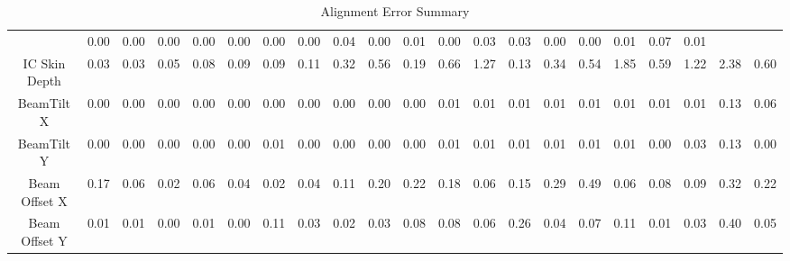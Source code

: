 \begin{table}[ht]
\begin{tabular}{|c | c c c c c c c c c c c c c c c c c c c c | }
 & 0.00
 & 0.00
 & 0.00
 & 0.00
 & 0.00
 & 0.00
 & 0.00
 & 0.04
 & 0.00
 & 0.01
 & 0.00
 & 0.03
 & 0.03
 & 0.00
 & 0.00
 & 0.01
 & 0.07
 & 0.01
\\
IC Skin Depth & 0.03
 & 0.03
 & 0.05
 & 0.08
 & 0.09
 & 0.09
 & 0.11
 & 0.32
 & 0.56
 & 0.19
 & 0.66
 & 1.27
 & 0.13
 & 0.34
 & 0.54
 & 1.85
 & 0.59
 & 1.22
 & 2.38
 & 0.60
\\
BeamTilt X & 0.00
 & 0.00
 & 0.00
 & 0.00
 & 0.00
 & 0.00
 & 0.00
 & 0.00
 & 0.00
 & 0.00
 & 0.01
 & 0.01
 & 0.01
 & 0.01
 & 0.01
 & 0.01
 & 0.01
 & 0.01
 & 0.13
 & 0.06
\\
BeamTilt Y & 0.00
 & 0.00
 & 0.00
 & 0.00
 & 0.00
 & 0.01
 & 0.00
 & 0.00
 & 0.00
 & 0.00
 & 0.01
 & 0.01
 & 0.01
 & 0.01
 & 0.01
 & 0.01
 & 0.00
 & 0.03
 & 0.13
 & 0.00
\\
Beam Offset X & 0.17
 & 0.06
 & 0.02
 & 0.06
 & 0.04
 & 0.02
 & 0.04
 & 0.11
 & 0.20
 & 0.22
 & 0.18
 & 0.06
 & 0.15
 & 0.29
 & 0.49
 & 0.06
 & 0.08
 & 0.09
 & 0.32
 & 0.22
\\
Beam Offset Y & 0.01
 & 0.01
 & 0.00
 & 0.01
 & 0.00
 & 0.11
 & 0.03
 & 0.02
 & 0.03
 & 0.08
 & 0.08
 & 0.06
 & 0.26
 & 0.04
 & 0.07
 & 0.11
 & 0.01
 & 0.03
 & 0.40
 & 0.05
\\

\hline
\end{tabular}
\label{tab:errorsummary}
\caption{Alignment Error Summary}
\end{table}
